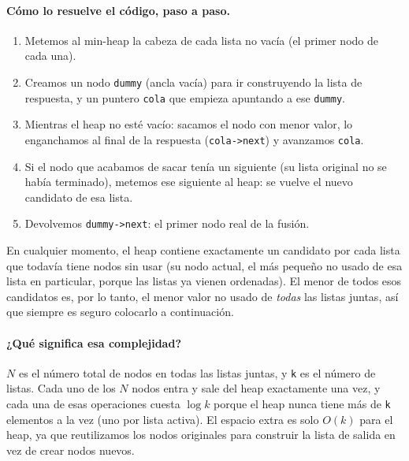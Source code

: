 \paragraph{Cómo lo resuelve el código, paso a paso.}
\begin{enumerate}
  \item Metemos al min-heap la cabeza de cada lista no vacía (el primer nodo
        de cada una).
  \item Creamos un nodo \texttt{dummy} (ancla vacía) para ir construyendo la
        lista de respuesta, y un puntero \texttt{cola} que empieza
        apuntando a ese \texttt{dummy}.
  \item Mientras el heap no esté vacío: sacamos el nodo con menor valor,
        lo enganchamos al final de la respuesta (\texttt{cola->next}) y
        avanzamos \texttt{cola}.
  \item Si el nodo que acabamos de sacar tenía un siguiente (su lista
        original no se había terminado), metemos ese siguiente al heap: se
        vuelve el nuevo candidato de esa lista.
  \item Devolvemos \texttt{dummy->next}: el primer nodo real de la fusión.
\end{enumerate}
En cualquier momento, el heap contiene exactamente un candidato por cada
lista que todavía tiene nodos sin usar (su nodo actual, el más pequeño no
usado de esa lista en particular, porque las listas ya vienen ordenadas). El
menor de todos esos candidatos es, por lo tanto, el menor valor no usado de
\emph{todas} las listas juntas, así que siempre es seguro colocarlo a
continuación.




\paragraph{¿Qué significa esa complejidad?} $N$ es el número total de nodos
en todas las listas juntas, y \texttt{k} es el número de listas. Cada uno de
los $N$ nodos entra y sale del heap exactamente una vez, y cada una de esas
operaciones cuesta $\log k$ porque el heap nunca tiene más de \texttt{k}
elementos a la vez (uno por lista activa). El espacio extra es solo
$O(k)$ para el heap, ya que reutilizamos los nodos originales para construir
la lista de salida en vez de crear nodos nuevos.

